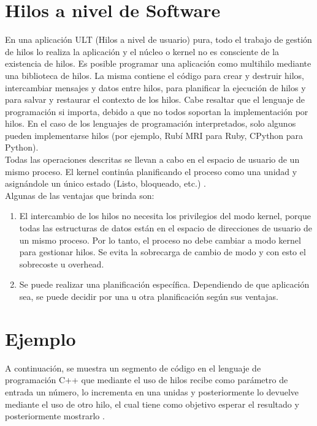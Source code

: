 \documentclass[11pt,letterpaper]{article}
\begin{document}
\section*{Hilos a nivel de Software}
En una aplicación ULT (Hilos a nivel de usuario) pura, todo el trabajo de gestión de hilos lo realiza la aplicación y el núcleo o kernel no es consciente de la existencia de hilos. Es posible programar una aplicación como multihilo mediante una biblioteca de hilos. La misma contiene el código para crear y destruir hilos, intercambiar mensajes y datos entre hilos, para planificar la ejecución de hilos y para salvar y restaurar el contexto de los hilos. Cabe resaltar que el lenguaje de programación si importa, debido a que no todos soportan la implementación por hilos. En el caso de los lenguajes de programación interpretados, solo algunos pueden implementarse hilos (por ejemplo, Rubí MRI para Ruby, CPython para Python).\\
Todas las operaciones descritas se llevan a cabo en el espacio de usuario de un mismo proceso. El kernel continúa planificando el proceso como una unidad y asignándole un único estado (Listo, bloqueado, etc.) \cite{5:Online}.\\
Algunas de las ventajas que brinda son:
\begin{enumerate}
\item El intercambio de los hilos no necesita los privilegios del modo kernel, porque todas las estructuras de datos están en el espacio de direcciones de usuario de un mismo proceso. Por lo tanto, el proceso no debe cambiar a modo kernel para gestionar hilos. Se evita la sobrecarga de cambio de modo y con esto el sobrecoste u overhead.
\item Se puede realizar una planificación específica. Dependiendo de que aplicación sea, se puede decidir por una u otra planificación según sus ventajas.
\end{enumerate}


\section*{Ejemplo}
A continuación, se muestra un segmento de código en el lenguaje de programación C++ que mediante el uso de hilos recibe como parámetro de entrada un número, lo incrementa en una unidas y posteriormente lo devuelve mediante el uso de otro hilo, el cual tiene como objetivo esperar el resultado y posteriormente mostrarlo \cite{6:Online}.
\\
\\
\end{document}
